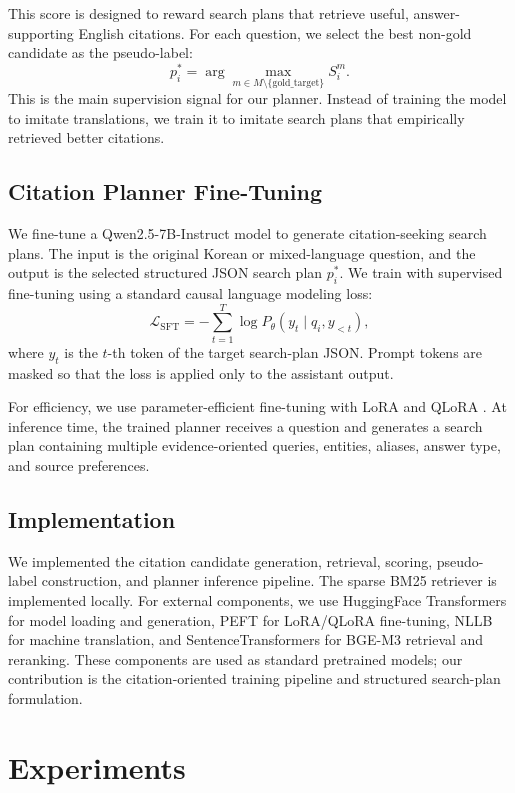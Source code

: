 \documentclass{article}
\begin{document}
This score is designed to reward search plans that retrieve useful, answer-supporting English citations. For each question, we select the best non-gold candidate as the pseudo-label:
\[
p_i^* = \arg\max_{m \in M \setminus \{\text{gold\_target}\}} S_i^m.
\]
This is the main supervision signal for our planner. Instead of training the model to imitate translations, we train it to imitate search plans that empirically retrieved better citations.

\subsection{Citation Planner Fine-Tuning}

We fine-tune a Qwen2.5-7B-Instruct model \cite{qwen2024qwen} to generate citation-seeking search plans. The input is the original Korean or mixed-language question, and the output is the selected structured JSON search plan $p_i^*$. We train with supervised fine-tuning using a standard causal language modeling loss:
\[
\mathcal{L}_{\text{SFT}}
= - \sum_{t=1}^{T} \log P_\theta(y_t \mid q_i, y_{<t}),
\]
where $y_t$ is the $t$-th token of the target search-plan JSON. Prompt tokens are masked so that the loss is applied only to the assistant output.

For efficiency, we use parameter-efficient fine-tuning with LoRA \cite{hu2021lora} and QLoRA \cite{dettmers2023qlora}. At inference time, the trained planner receives a question and generates a search plan containing multiple evidence-oriented queries, entities, aliases, answer type, and source preferences.

\subsection{Implementation}

We implemented the citation candidate generation, retrieval, scoring, pseudo-label construction, and planner inference pipeline. The sparse BM25 retriever is implemented locally. For external components, we use HuggingFace Transformers for model loading and generation, PEFT for LoRA/QLoRA fine-tuning, NLLB for machine translation, and SentenceTransformers for BGE-M3 retrieval and reranking. These components are used as standard pretrained models; our contribution is the citation-oriented training pipeline and structured search-plan formulation.

\section{Experiments}
\label{sec:experiments}
\end{document}
